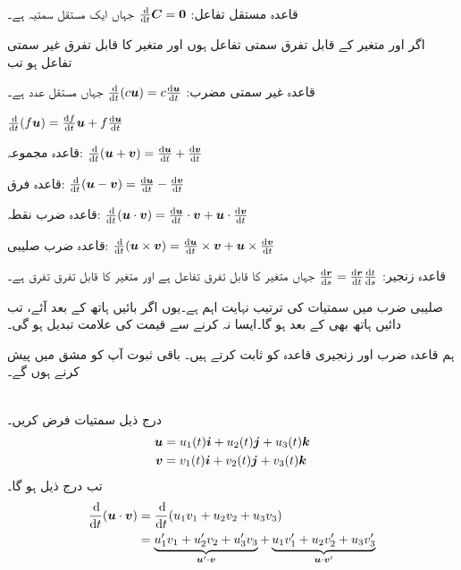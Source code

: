 \\
\begin{description}
\item{قاعدہ مستقل تفاعل:}\quad
$\frac{\dif}{\dif t}\kvec{C}=\kvec{0}$\quad
جہاں  ایک مستقل سمتیہ ہے۔

اگر  اور  متغیر  کے  قابل تفرق سمتی تفاعل ہوں اور  متغیر  کا قابل تفرق غیر سمتی تفاعل ہو  تب
\item{قاعدہ غیر سمتی مضرب:}\quad
$\frac{\dif}{\dif t}(c\kvec{u})=c\frac{\dif \kvec{u}}{\dif t}$\quad
جہاں   مستقل عدد ہے۔

\phantom{\hspace{1.5cm}}$\frac{\dif}{\dif t}(f\kvec{u})=\frac{\dif f}{\dif t}\kvec{u}+f\frac{\dif \kvec{u}}{\dif t}$
\item{قاعدہ مجموعہ:}\quad
$\frac{\dif}{\dif t}(\kvec{u}+\kvec{v})=\frac{\dif \kvec{u}}{\dif t}+\frac{\dif \kvec{v}}{\dif t}$
\item{قاعدہ فرق:}\quad
$\frac{\dif}{\dif t}(\kvec{u}-\kvec{v})=\frac{\dif \kvec{u}}{\dif t}-\frac{\dif \kvec{v}}{\dif t}$
\item{قاعدہ  ضرب نقطہ:}\quad
$\frac{\dif}{\dif t}(\kvec{u}\cdot \kvec{v})=\frac{\dif \kvec{u}}{\dif t}\cdot \kvec{v}+\kvec{u}\cdot\frac{\dif \kvec{v}}{\dif t}$
\item{قاعدہ  ضرب صلیبی:}\quad
$\frac{\dif}{\dif t}(\kvec{u}\times \kvec{v})=\frac{\dif \kvec{u}}{\dif t}\times \kvec{v}+\kvec{u}\times\frac{\dif \kvec{v}}{\dif t}$
\item{قاعدہ  زنجیر:}\quad
$\frac{\dif \kvec{r}}{\dif s}=\frac{\dif \kvec{r}}{\dif t}\frac{\dif t}{\dif s}$\quad
جہاں   متغیر  کا قابل تفرق تفاعل ہے اور  متغیر  کا قابل تفرق تفرق ہے۔
\end{description}

صلیبی ضرب میں سمتیات کی ترتیب نہایت اہم ہے۔یوں اگر بائیں ہاتھ  کے بعد  آئے، تب دائیں ہاتھ بھی  کے بعد ہو    گا۔ایسا نہ کرنے سے قیمت کی علامت تبدیل ہو گی۔

ہم قاعدہ  ضرب اور زنجیری قاعدہ کو ثابت کرتے ہیں۔ باقی ثبوت  آپ کو مشق میں پیش کرنے ہوں گے۔

\\
درج ذیل سمتیات فرض کریں۔
\begin{align*}
{\ensuremath{{\boldsymbol{u}}}}&=u_1(t){\boldsymbol{i}}+u_2(t){\boldsymbol{j}}+u_3(t){\boldsymbol{k}}\\
{{\boldsymbol{v}}}&=v_1(t){\boldsymbol{i}}+v_2(t){\boldsymbol{j}}+v_3(t){\boldsymbol{k}}
\end{align*} 
تب درج  ذیل ہو گا۔
\begin{align*}
\frac{\dif}{\dif t}(\kvec{u}\cdot \kvec{v})&=\frac{\dif}{\dif t}(u_1v_1+u_2v_2+u_3v_3)\\
&=\underbrace{u_1'v_1+u_2'v_2+u_3'v_3}_{\kvec{u}'\cdot \kvec{v}}+\underbrace{u_1v_1'+u_2v_2'+u_3v_3'}_{\kvec{u}\cdot\kvec{v}'}
\end{align*}

